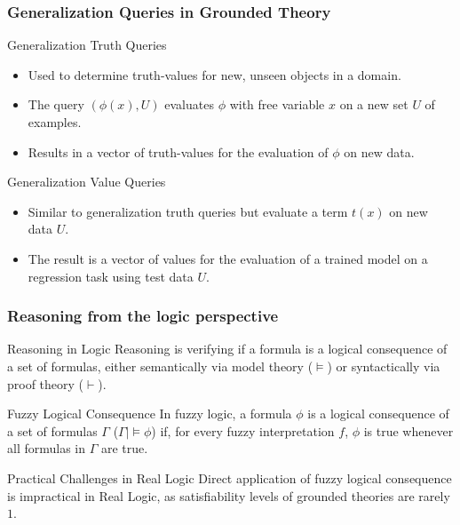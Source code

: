 \documentclass{beamer}
\begin{document}
\begin{frame}
\frametitle{Generalization Queries in Grounded Theory}
\begin{block}{Generalization Truth Queries}
\begin{itemize}
    \item Used to determine truth-values for new, unseen objects in a domain.
    \item The query \( (\phi(x), U) \) evaluates \( \phi \) with free variable \( x \) on a new set \( U \) of examples.
    \item Results in a vector of truth-values for the evaluation of \( \phi \) on new data.
\end{itemize}
\end{block}

\begin{block}{Generalization Value Queries}
\begin{itemize}
    \item Similar to generalization truth queries but evaluate a term \( t(x) \) on new data \( U \).
    \item The result is a vector of values for the evaluation of a trained model on a regression task using test data \( U \).
\end{itemize}
\end{block}
\end{frame}

\begin{frame}
\frametitle{Reasoning from the logic perspective}
\begin{block}{Reasoning in Logic}
Reasoning is verifying if a formula is a logical consequence of a set
of formulas, either semantically via model theory (\(\models\)) or
syntactically via proof theory (\(\vdash\)).
\end{block}

\begin{block}{Fuzzy Logical Consequence}
  In fuzzy logic, a formula \(\phi\) is a logical consequence of a set
  of formulas \(\Gamma\) (\(\Gamma | \models \phi\)) if, for every
  fuzzy interpretation \(f\), \(\phi\) is true whenever all formulas
  in \(\Gamma\) are true.
\end{block}

\begin{block}{Practical Challenges in Real Logic}
Direct application of fuzzy logical consequence is impractical in Real
Logic, as satisfiability levels of grounded theories are rarely $1$.
\end{block}
\end{frame}
\end{document}
